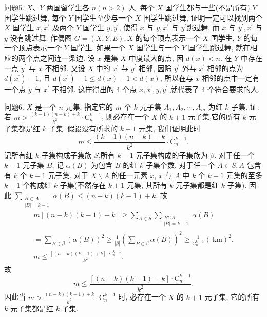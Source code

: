 问题5. $X 、 Y$ 两国留学生各 $n(n>2)$ 人, 每个 $X$ 国学生都与一些(不是所有) $Y$国学生跳过舞, 每个 $Y$ 国学生至少与一个 $X$ 国学生跳过舞, 证明一定可以找到两个 $X$ 国学生 $x, x^{\prime}$ 及两个 $Y$ 国学生 $y, y^{\prime}$, 使得 $x$ 与 $y, x^{\prime}$ 与 $y^{\prime}$跳过舞, 而 $x$ 与 $y^{\prime}, x^{\prime}$ 与 $y$ 没有跳过舞.
作偶图 $G=(X, Y ; E), X$ 的每个顶点表示一个 $X$ 国学生, $Y$ 的每一个顶点表示一个 $Y$ 国学生.
如果一个 $X$ 国学生与一个 $Y$ 国学生跳过舞, 就在相应的两个点之间连一条边.
设 $x$ 是集 $X$ 中度最大的点, 因 $d(x)<n$. 在 $Y$ 中存在一点 $y^{\prime}$ 与 $x$ 不相邻.
又设 $X$ 中的 $x^{\prime}$ 与 $y^{\prime}$ 相邻, 因除 $y^{\prime}$ 外与 $x^{\prime}$ 相邻的点为 $d\left(x^{\prime}\right)-1$, 且 $d\left(x^{\prime}\right)-1 \leqslant d(x)-1<d(x)$, 所以在与 $x$ 相邻的点中一定有一个点 $y$ 与 $x^{\prime}$ 不相邻.
这样得出的 4 个点 $x, x^{\prime}, y, y^{\prime}$ 就代表了 4 个符合要求的人.



问题6. $X$ 是一个 $n$ 元集, 指定它的 $m$ 个 $k$ 元子集 $A_1, A_2, \cdots, A_m$ 为红 $k$ 子集.
证: 若 $m>\frac{(k-1)(n-k)+k}{k^2} \cdot \mathrm{C}_n^{k-1}$, 则必存在一个 $X$ 的 $k+1$ 元子集,它的所有 $k$ 元子集都是红 $k$ 子集.
假设没有所求的 $k+1$ 元集, 我们证明此时
$$
m \leqslant \frac{(k-1)(n-k)+k}{k^2} \cdot \mathrm{C}_n^{k-1} .
$$
记所有红 $k$ 子集构成子集族 $S$,所有 $k-1$ 元子集构成的子集族为 $\beta$. 对于任一个 $k-1$ 元子集 $B$, 记 $\alpha(B)$ 为包含 $B$ 的红 $k$ 子集个数.
对于任一个 $A \in S, A$ 包含有 $k$ 个 $k-1$ 元子集.
对于 $X \backslash A$ 的任一元素 $x$, $x$ 与 $A$ 中 $k$ 个 $k-1$ 元集的至多 $k-1$ 个构成红 $k$ 子集(不然存在 $k+1$ 元集, 其所有 $k$ 元子集都是红 $k$ 子集). 因此 $\sum_{\substack{B \subset A \\|B|=k-1}} \alpha(B) \leqslant(n-k)(k-1)+k$.
故
$$
\begin{gathered}
m[(n-k)(k-1)+k] \geqslant \sum_{A \in S} \sum_{\substack{B C A \\
|B|=k-1}} \alpha(B) \\
=\sum_{B \in \beta}(\alpha(B))^2 \geqslant \frac{1}{|\beta|}\left(\sum_{B \in \beta} \alpha(B)\right)^2 \geqslant \frac{1}{\mathrm{C}_n^{k-1}}(\mathrm{~km})^2 . \\
m \leqslant \frac{[(n-k)(k-1)+k] \cdot \mathrm{C}_n^{k-1}}{k^2} .
\end{gathered}
$$
故
$$
m \leqslant \frac{[(n-k)(k-1)+k] \cdot \mathrm{C}_n^{k-1}}{k^2} .
$$
因此当 $m>\frac{(n-k)(k-1)+k}{k^2} \cdot \mathrm{C}_n^{k-1}$ 时, 必存在一个 $X$ 的 $k+1$ 元子集, 它的所有 $k$ 元子集都是红 $k$ 子集.



